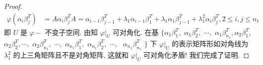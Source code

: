 \documentclass[../../main.tex]{subfiles}
\begin{document}
\begin{proof}
\begin{align*}
\varphi(\alpha_i \beta_j^T) &= A\alpha_i \beta_j^T A = \alpha_{i - 1} \beta_{j - 1}^T + \lambda_1 \alpha_{i - 1} \beta_1^T + \lambda_1 \alpha_1 \beta_{j - 1}^T + \lambda_1^2 \alpha_i \beta_j^T, 2 \leqslant  i, j \leqslant  n_1
\end{align*}
即 $U$ 是 $\varphi-$ 不变子空间. 由知 $\varphi|_U$ 可对角化.
在基 $\{$$\alpha_1 \beta_1^T,$ $ \alpha_1 \beta_2^T, $ $\cdots,$ $ \alpha_1 \beta_{n_1}^T,$$  \alpha_2 \beta_1^T, $ $\alpha_2 \beta_2^T, $$\cdots, $ $\alpha_2 \beta_{n_1}^T,$ $ \cdots,$ $ \alpha_{n_1} \beta_1^T,$ $ \alpha_{n_1} \beta_2^T,$ $ \cdots,$ $ $ $\alpha_{n_1} \beta_{n_1}^T$ $\}$ 下 $\varphi|_U$ 的表示矩阵形如对角线为 $\lambda_1^2$ 的上三角矩阵且不是对角矩阵, 这就和 $\varphi|_U$ 可对角化矛盾!
我们完成了证明.
\end{proof}
\end{document}
